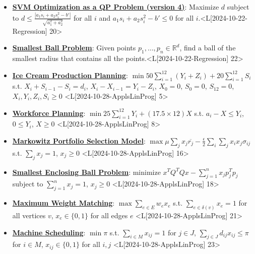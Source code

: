 \documentclass{article}%
\begin{document}
\begin{itemize}[[leftmargin=*]]
\item \href{https://www.math.purdue.edu/~yipn/421/2024-10-22-Regression.pdf#page=20}{\textbf{SVM Optimization as a QP Problem (version 4)}}: Maximize $d$ subject to $d \le \frac{|a_1 s_i + a_2 s_i^2 - b'|}{\sqrt{a_1^2 + a_2^2}}$ for all $i$ and $a_1 s_i + a_2 s_i^2 - b' \le 0$ for all $i$.<L[2024-10-22-Regression] 20>%
\item \href{https://www.math.purdue.edu/~yipn/421/2024-10-22-Regression.pdf#page=22}{\textbf{Smallest Ball Problem}}: Given points $p_1, \dots, p_n \in \mathbb{R}^d$, find a ball of the smallest radius that contains all the points.<L[2024-10-22-Regression] 22>%
\end{itemize}%
\begin{itemize}[[leftmargin=*]]%
\item \href{https://www.math.purdue.edu/~yipn/421/2024-10-28-ApplsLinProg.pdf#page=5}{\textbf{Ice Cream Production Planning}}: $\min 50 \sum_{i=1}^{12} (Y_i + Z_i) + 20 \sum_{i=1}^{12} S_i$  s.t. $X_i + S_{i-1} - S_i = d_i$, $X_i - X_{i-1} = Y_i - Z_i$, $X_0 = 0$, $S_0 = 0$, $S_{12} = 0$, $X_i, Y_i, Z_i, S_i \ge 0$ <L[2024-10-28-ApplsLinProg] 5>%
\item \href{https://www.math.purdue.edu/~yipn/421/2024-10-28-ApplsLinProg.pdf#page=8}{\textbf{Workforce Planning}}: $\min 25 \sum_{i=1}^{12} Y_i + (17.5 \times 12) X$ s.t. $a_i - X \le Y_i$, $0 \le Y_i$, $X \ge 0$ <L[2024-10-28-ApplsLinProg] 8>%
\item \href{https://www.math.purdue.edu/~yipn/421/2024-10-28-ApplsLinProg.pdf#page=16}{\textbf{Markowitz Portfolio Selection Model}}: $\max \mu \sum_{j} x_j \overline{r_j} - \frac{\epsilon}{2} \sum_{i} \sum_{j} x_i x_j \sigma_{ij}$ s.t. $\sum_{j} x_j = 1$, $x_j \ge 0$ <L[2024-10-28-ApplsLinProg] 16>%
\item \href{https://www.math.purdue.edu/~yipn/421/2024-10-28-ApplsLinProg.pdf#page=18}{\textbf{Smallest Enclosing Ball Problem}}: minimize $x^T Q^T Q x - \sum_{j=1}^n x_j p_j^T p_j$ subject to $\sum_{j=1}^n x_j = 1$, $x_j \ge 0$ <L[2024-10-28-ApplsLinProg] 18>%
\item \href{https://www.math.purdue.edu/~yipn/421/2024-10-28-ApplsLinProg.pdf#page=21}{\textbf{Maximum Weight Matching}}: $\max \sum_{e \in E} w_e x_e$ s.t. $\sum_{e \in \delta(v)} x_e = 1$ for all vertices $v$, $x_e \in \{0, 1\}$ for all edges $e$ <L[2024-10-28-ApplsLinProg] 21>%
\item \href{https://www.math.purdue.edu/~yipn/421/2024-10-28-ApplsLinProg.pdf#page=23}{\textbf{Machine Scheduling}}: $\min \pi$ s.t. $\sum_{i \in M} x_{ij} = 1$ for $j \in J$, $\sum_{j \in J} d_{ij} x_{ij} \le \pi$ for $i \in M$, $x_{ij} \in \{0, 1\}$ for all $i, j$ <L[2024-10-28-ApplsLinProg] 23>%

\end{itemize}
\end{document}
